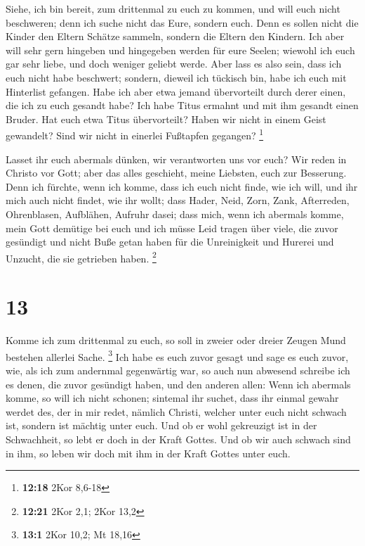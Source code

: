  Siehe, ich bin bereit, zum drittenmal zu euch zu kommen,
und will euch nicht beschweren; denn ich suche nicht das Eure, sondern
euch. Denn es sollen nicht die Kinder den Eltern Schätze sammeln,
sondern die Eltern den Kindern.  Ich aber will sehr gern
hingeben und hingegeben werden für eure Seelen; wiewohl ich euch gar
sehr liebe, und doch weniger geliebt werde.  Aber lass es
also sein, dass ich euch nicht habe beschwert; sondern, dieweil ich
tückisch bin, habe ich euch mit Hinterlist gefangen. 
Habe ich aber etwa jemand übervorteilt durch derer einen, die ich zu
euch gesandt habe?  Ich habe Titus ermahnt und mit ihm
gesandt einen Bruder. Hat euch etwa Titus übervorteilt? Haben wir nicht
in einem Geist gewandelt? Sind wir nicht in einerlei Fußtapfen gegangen?
\footnote{\textbf{12:18} 2Kor 8,6-18}

 Lasset ihr euch abermals dünken, wir verantworten uns
vor euch? Wir reden in Christo vor Gott; aber das alles geschieht, meine
Liebsten, euch zur Besserung.  Denn ich fürchte, wenn ich
komme, dass ich euch nicht finde, wie ich will, und ihr mich auch nicht
findet, wie ihr wollt; dass Hader, Neid, Zorn, Zank, Afterreden,
Ohrenblasen, Aufblähen, Aufruhr dasei;  dass mich, wenn
ich abermals komme, mein Gott demütige bei euch und ich müsse Leid
tragen über viele, die zuvor gesündigt und nicht Buße getan haben für
die Unreinigkeit und Hurerei und Unzucht, die sie getrieben haben.
\footnote{\textbf{12:21} 2Kor 2,1; 2Kor 13,2}

\hypertarget{section-7}{%
\section{13}\label{section-7}}

 Komme ich zum drittenmal zu euch, so soll in zweier oder
dreier Zeugen Mund bestehen allerlei Sache. \footnote{\textbf{13:1} 2Kor
  10,2; Mt 18,16}  Ich habe es euch zuvor gesagt und sage
es euch zuvor, wie, als ich zum andernmal gegenwärtig war, so auch nun
abwesend schreibe ich es denen, die zuvor gesündigt haben, und den
anderen allen: Wenn ich abermals komme, so will ich nicht schonen;
 sintemal ihr suchet, dass ihr einmal gewahr werdet des,
der in mir redet, nämlich Christi, welcher unter euch nicht schwach ist,
sondern ist mächtig unter euch.  Und ob er wohl gekreuzigt
ist in der Schwachheit, so lebt er doch in der Kraft Gottes. Und ob wir
auch schwach sind in ihm, so leben wir doch mit ihm in der Kraft Gottes
unter euch.

